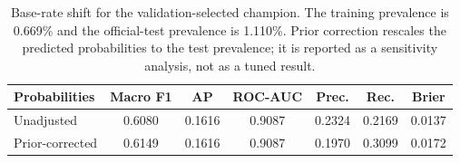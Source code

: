 \begin{table}[H]
\centering
\caption{Base-rate shift for the validation-selected champion. The training prevalence
is 0.669\% and the official-test prevalence is 1.110\%. Prior correction rescales the
predicted probabilities to the test prevalence; it is reported as a sensitivity analysis,
not as a tuned result.}
\label{tab:bo-base}
\small
\begin{tabular}{lcccccc}
\toprule
Probabilities & Macro F1 & AP & ROC-AUC & Prec. & Rec. & Brier \\
\midrule
Unadjusted & 0.6080 & 0.1616 & 0.9087 & 0.2324 & 0.2169 & 0.0137 \\
Prior-corrected & 0.6149 & 0.1616 & 0.9087 & 0.1970 & 0.3099 & 0.0172 \\
\bottomrule
\end{tabular}
\end{table}
